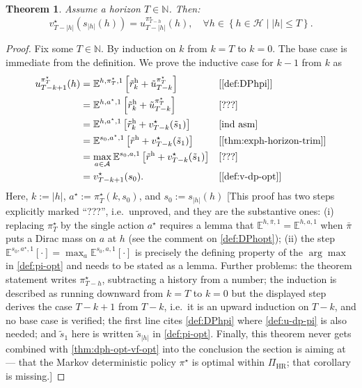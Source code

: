 \documentclass[letterpaper]{article}
\theoremstyle{plain}
\newtheorem{theorem}{Theorem}[subsection]
\theoremstyle{definition}
\theoremstyle{remark}
\newcommand{\Nats}{\mathbb{N}}
\newcommand{\E}{\mathbb{E}}
\newcommand{\opt}{^{\star}}
\newcommand{\PiHR}{\Pi_{\mathrm{HR}}}
\newcommand{\rew}{\tilde{r}^{\mathrm{h}}}
\newcommand{\why}[1]{\text{[#1]}}
\newcommand{\cc}[1]{\textcolor{ccolor}{[#1]}}
\newcommand{\lean}[1]{\textcolor{blue}{(\emph{LEAN}: \texttt{#1})}}
\begin{document}
\begin{theorem}
Assume a horizon $T\in \Nats$. Then:
\[
  v\opt_{T-|h|}(s_{|h|}(h)) = u^{\pi\opt_{T-h}}_{T-|h|}(h), \quad
  \forall h\in \left\{ h\in \mathcal{H} \mid |h| \le T \right\}.
\]
\end{theorem}
\begin{proof}
Fix some $T \in \Nats$. By induction on $k$ from $k = T$ to $k=0$. The base case is immediate from the definition. We prove the inductive case for $k-1$ from $k$ as
\begin{align*}
u^{\pi\opt_T}_{T-k + 1}(h)
  &=  \E^{h, \pi\opt_T, 1} \left[ \rew_k + \tilde{u}^{\pi\opt_T}_{T-k} \right]
  && \why{\cref{def:DPhpi}} \\
  &=  \E^{h, a\opt, 1} \left[ \rew_k + \tilde{u}^{\pi\opt_T}_{T-k} \right]
  && \why{???} \\
  &=  \E^{h, a\opt, 1} \left[ \rew_{k} + v_{T-k}\opt(\tilde{s}_1) \right]
  && \why{ind asm} \\
  &=  \E^{s_0, a\opt, 1} \left[ \rew +  v_{T-k}\opt(\tilde{s}_1) \right]
  && \why{\cref{thm:exph-horizon-trim}} \\
  &=  \max_{a\in \mathcal{A}} \E^{s_0, a, 1} \left[ \rew +  v_{T-k}\opt(\tilde{s}_1) \right]
  && \why{???} \\
  &=  v_{T-k+1}\opt(s_0). && \why{\cref{def:v-dp-opt}}
\end{align*}
Here, $k := |h|$, $a\opt := \pi\opt_T(k, s_0)$, and $s_0 := s_{|h|}(h)$
\cc{This proof has two steps explicitly marked ``???'', i.e.\ unproved, and they are the substantive ones: (i) replacing $\pi\opt_T$ by the single action $a\opt$ requires a lemma that $\E^{h,\bar{\pi},1} = \E^{h,a,1}$ when $\bar{\pi}$ puts a Dirac mass on $a$ at $h$ (see the comment on \cref{def:DPhopt}); (ii) the step $\E^{s_0,a\opt,1}[\cdot] = \max_{a}\E^{s_0,a,1}[\cdot]$ is precisely the defining property of the $\arg\max$ in \cref{def:pi-opt} and needs to be stated as a lemma. Further problems: the theorem statement writes $\pi\opt_{T-h}$, subtracting a history from a number; the induction is described as running downward from $k=T$ to $k=0$ but the displayed step derives the case $T-k+1$ from $T-k$, i.e.\ it is an upward induction on $T-k$, and no base case is verified; the first line cites \cref{def:DPhpi} where \cref{def:u-dp-pi} is also needed; and $\tilde{s}_1$ here is written $\tilde{s}_{|h|}$ in \cref{def:pi-opt}. Finally, this theorem never gets combined with \cref{thm:dph-opt-vf-opt} into the conclusion the section is aiming at --- that the Markov deterministic policy $\pi\opt$ is optimal within $\PiHR$; that corollary is missing.}
\end{proof}
\end{document}
